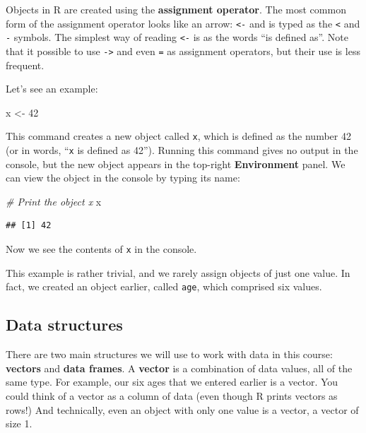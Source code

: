 \documentclass[
]{memoir}
\newenvironment{Shaded}{\begin{snugshade}}{\end{snugshade}}
\newcommand{\CommentTok}[1]{\textcolor[rgb]{0.56,0.35,0.01}{\textit{#1}}}
\newcommand{\DecValTok}[1]{\textcolor[rgb]{0.00,0.00,0.81}{#1}}
\newcommand{\NormalTok}[1]{#1}
\newcommand{\OtherTok}[1]{\textcolor[rgb]{0.56,0.35,0.01}{#1}}
\begin{document}
Objects in R are created using the \textbf{assignment operator}. The most common form of the assignment operator looks like an arrow: \texttt{\textless{}-} and is typed as the \texttt{\textless{}} and \texttt{-} symbols. The simplest way of reading \texttt{\textless{}-} is as the words ``is defined as''. Note that it possible to use \texttt{-\textgreater{}} and even \texttt{=} as assignment operators, but their use is less frequent.

Let's see an example:

\begin{Shaded}
\begin{Highlighting}[]
\NormalTok{x }\OtherTok{\textless{}{-}} \DecValTok{42}
\end{Highlighting}
\end{Shaded}

This command creates a new object called \texttt{x}, which is defined as the number 42 (or in words, ``\texttt{x} is defined as 42''). Running this command gives no output in the console, but the new object appears in the top-right \textbf{Environment} panel. We can view the object in the console by typing its name:

\begin{Shaded}
\begin{Highlighting}[]
\CommentTok{\# Print the object x}
\NormalTok{x}
\end{Highlighting}
\end{Shaded}

\begin{verbatim}
## [1] 42
\end{verbatim}

Now we see the contents of \texttt{x} in the console.

This example is rather trivial, and we rarely assign objects of just one value. In fact, we created an object earlier, called \texttt{age}, which comprised six values.

\hypertarget{data-structures}{%
\subsection{Data structures}\label{data-structures}}

There are two main structures we will use to work with data in this course: \textbf{vectors} and \textbf{data frames}. A \textbf{vector} is a combination of data values, all of the same type. For example, our six ages that we entered earlier is a vector. You could think of a vector as a column of data (even though R prints vectors as rows!) And technically, even an object with only one value is a vector, a vector of size 1.
\end{document}
